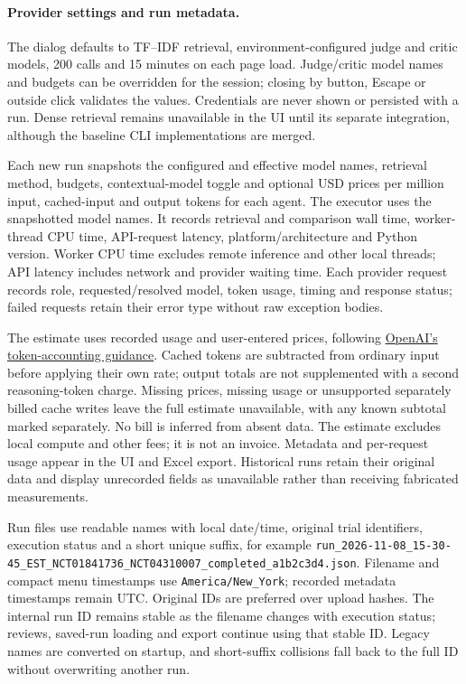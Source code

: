 \documentclass[10pt,letterpaper]{article}
\newcommand{\pathcode}[1]{\nolinkurl{#1}}
\begin{document}
\paragraph{Provider settings and run metadata.}
The dialog defaults to TF--IDF retrieval, environment-configured judge and
critic models, 200 calls and 15 minutes on each page load. Judge/critic model
names and budgets can be overridden for the session; closing by button,
Escape or outside click validates the values. Credentials are never shown or
persisted with a run. Dense retrieval remains unavailable in the UI until its
separate integration, although the baseline CLI implementations are merged.

Each new run snapshots the configured and effective model names, retrieval
method, budgets, contextual-model toggle and optional USD prices per million
input, cached-input and output tokens for each agent. The executor uses the
snapshotted model names. It records retrieval and comparison wall time,
worker-thread CPU time, API-request latency, platform/architecture and Python
version. Worker CPU time excludes remote inference and other local threads;
API latency includes network and provider waiting time. Each provider request
records role, requested/resolved model, token usage, timing and response status;
failed requests retain their error type without raw exception bodies.

The estimate uses recorded usage and user-entered prices, following
\href{https://developers.openai.com/api/docs/guides/prompt-caching}{OpenAI's token-accounting guidance}.
Cached tokens are subtracted from ordinary input before applying their own
rate; output totals are not supplemented with a second reasoning-token charge.
Missing prices, missing usage or unsupported separately billed cache writes
leave the full estimate unavailable, with any known subtotal marked separately.
No bill is inferred from absent data. The estimate excludes local compute and
other fees; it is not an invoice. Metadata and per-request usage appear in the
UI and Excel export. Historical runs retain their original data and display
unrecorded fields as unavailable rather than receiving fabricated measurements.

Run files use readable names with local date/time, original trial identifiers,
execution status and a short unique suffix, for example
\pathcode{run_2026-11-08_15-30-45_EST_NCT01841736_NCT04310007_completed_a1b2c3d4.json}.
Filename and compact menu timestamps use \pathcode{America/New_York}; recorded
metadata timestamps remain UTC. Original IDs are preferred over upload hashes.
The internal run ID remains stable as the filename changes with execution
status; reviews, saved-run loading and export continue using that stable ID.
Legacy names are converted on startup, and short-suffix collisions fall back
to the full ID without overwriting another run.
\end{document}
